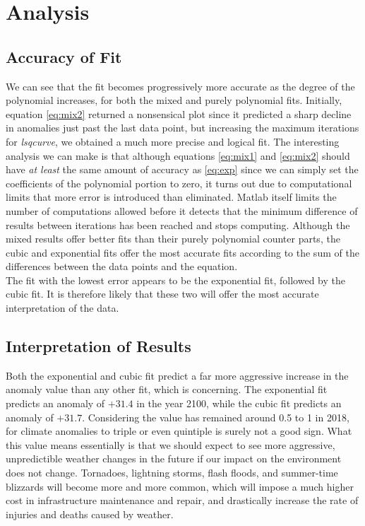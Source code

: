 \documentclass[11pt]{article}
\begin{document}
\section{Analysis}
\subsection{Accuracy of Fit}
We can see that the fit becomes progressively more accurate as the degree of the polynomial increases, for both the mixed and purely polynomial fits. Initially, equation \eqref{eq:mix2} returned a nonsensical plot since it predicted a sharp decline in anomalies just past the last data point, but increasing the maximum iterations for \textit{lsqcurve}, we obtained a much more precise and logical fit. The interesting analysis we can make is that although equations \eqref{eq:mix1} and \eqref{eq:mix2} should have \textit{at least} the same amount of accuracy as \eqref{eq:exp} since we can simply set the coefficients of the polynomial portion to zero, it turns out due to computational limits that more error is introduced than eliminated. Matlab itself limits the number of computations allowed before it detects that the minimum difference of results between iterations has been reached and stops computing. Although the mixed results offer better fits than their purely polynomial counter parts, the cubic and exponential fits offer the most accurate fits according to the sum of the differences between the data points and the equation.\\
The fit with the lowest error appears to be the exponential fit, followed by the cubic fit. It is therefore likely that these two will offer the most accurate interpretation of the data.
\subsection{Interpretation of Results}
Both the exponential and cubic fit predict a far more aggressive increase in the anomaly value than any other fit, which is concerning. The exponential fit predicts an anomaly of $+31.4$ in the year 2100, while the cubic fit predicts an anomaly of $+31.7$. Considering the value has remained around 0.5 to 1 in 2018, for climate anomalies to triple or even quintiple is surely not a good sign. What this value means essentially is that we should expect to see more aggressive, unpredictible weather changes in the future if our impact on the environment does not change. Tornadoes, lightning storms, flash floods, and summer-time blizzards will become more and more common, which will impose a much higher cost in infrastructure maintenance and repair, and drastically increase the rate of injuries and deaths caused by weather.
\end{document}
